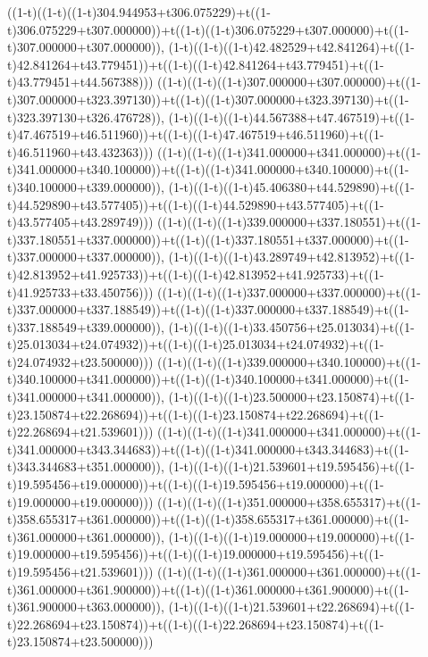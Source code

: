 ((1-t)((1-t)((1-t)304.944953+t306.075229)+t((1-t)306.075229+t307.000000))+t((1-t)((1-t)306.075229+t307.000000)+t((1-t)307.000000+t307.000000)),                                     (1-t)((1-t)((1-t)42.482529+t42.841264)+t((1-t)42.841264+t43.779451))+t((1-t)((1-t)42.841264+t43.779451)+t((1-t)43.779451+t44.567388)))
((1-t)((1-t)((1-t)307.000000+t307.000000)+t((1-t)307.000000+t323.397130))+t((1-t)((1-t)307.000000+t323.397130)+t((1-t)323.397130+t326.476728)),                                     (1-t)((1-t)((1-t)44.567388+t47.467519)+t((1-t)47.467519+t46.511960))+t((1-t)((1-t)47.467519+t46.511960)+t((1-t)46.511960+t43.432363)))
((1-t)((1-t)((1-t)341.000000+t341.000000)+t((1-t)341.000000+t340.100000))+t((1-t)((1-t)341.000000+t340.100000)+t((1-t)340.100000+t339.000000)),                                     (1-t)((1-t)((1-t)45.406380+t44.529890)+t((1-t)44.529890+t43.577405))+t((1-t)((1-t)44.529890+t43.577405)+t((1-t)43.577405+t43.289749)))
((1-t)((1-t)((1-t)339.000000+t337.180551)+t((1-t)337.180551+t337.000000))+t((1-t)((1-t)337.180551+t337.000000)+t((1-t)337.000000+t337.000000)),                                     (1-t)((1-t)((1-t)43.289749+t42.813952)+t((1-t)42.813952+t41.925733))+t((1-t)((1-t)42.813952+t41.925733)+t((1-t)41.925733+t33.450756)))
((1-t)((1-t)((1-t)337.000000+t337.000000)+t((1-t)337.000000+t337.188549))+t((1-t)((1-t)337.000000+t337.188549)+t((1-t)337.188549+t339.000000)),                                     (1-t)((1-t)((1-t)33.450756+t25.013034)+t((1-t)25.013034+t24.074932))+t((1-t)((1-t)25.013034+t24.074932)+t((1-t)24.074932+t23.500000)))
((1-t)((1-t)((1-t)339.000000+t340.100000)+t((1-t)340.100000+t341.000000))+t((1-t)((1-t)340.100000+t341.000000)+t((1-t)341.000000+t341.000000)),                                     (1-t)((1-t)((1-t)23.500000+t23.150874)+t((1-t)23.150874+t22.268694))+t((1-t)((1-t)23.150874+t22.268694)+t((1-t)22.268694+t21.539601)))
((1-t)((1-t)((1-t)341.000000+t341.000000)+t((1-t)341.000000+t343.344683))+t((1-t)((1-t)341.000000+t343.344683)+t((1-t)343.344683+t351.000000)),                                     (1-t)((1-t)((1-t)21.539601+t19.595456)+t((1-t)19.595456+t19.000000))+t((1-t)((1-t)19.595456+t19.000000)+t((1-t)19.000000+t19.000000)))
((1-t)((1-t)((1-t)351.000000+t358.655317)+t((1-t)358.655317+t361.000000))+t((1-t)((1-t)358.655317+t361.000000)+t((1-t)361.000000+t361.000000)),                                     (1-t)((1-t)((1-t)19.000000+t19.000000)+t((1-t)19.000000+t19.595456))+t((1-t)((1-t)19.000000+t19.595456)+t((1-t)19.595456+t21.539601)))
((1-t)((1-t)((1-t)361.000000+t361.000000)+t((1-t)361.000000+t361.900000))+t((1-t)((1-t)361.000000+t361.900000)+t((1-t)361.900000+t363.000000)),                                     (1-t)((1-t)((1-t)21.539601+t22.268694)+t((1-t)22.268694+t23.150874))+t((1-t)((1-t)22.268694+t23.150874)+t((1-t)23.150874+t23.500000)))
